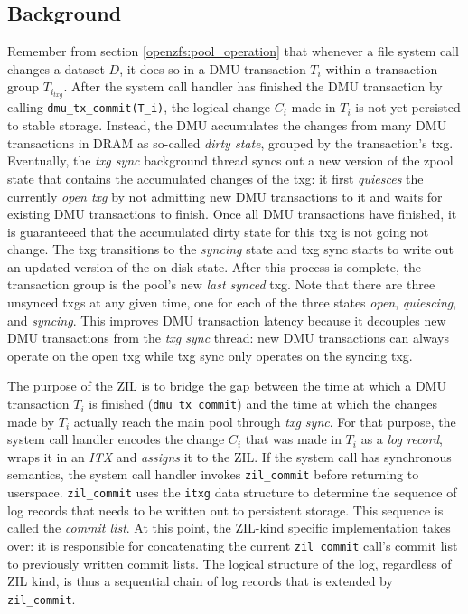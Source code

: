 \documentclass[12pt,a4paper,twoside]{book}
\begin{document}
\subsection{Background}\label{di:prb:background}
Remember from section \ref{openzfs:pool_operation} that whenever a file system call changes a dataset $D$, it does so in a DMU transaction $T_i$ within a transaction group $T_{i_{txg}}$.
After the system call handler has finished the DMU transaction by calling \lstinline{dmu_tx_commit(T_i)}, the logical change $C_i$ made in $T_i$ is not yet persisted to stable storage.
Instead, the DMU accumulates the changes from many DMU transactions in DRAM as so-called \textit{dirty state}, grouped by the transaction's txg.
Eventually, the \textit{txg sync} background thread syncs out a new version of the zpool state that contains the accumulated changes of the txg:
it first \textit{quiesces} the currently \textit{open txg} by not admitting new DMU transactions to it and waits for existing DMU transactions to finish.
Once all DMU transactions have finished, it is guaranteeed that the accumulated dirty state for this txg is not going not change.
The txg transitions to the \textit{syncing} state and txg sync starts to write out an updated version of the on-disk state.
After this process is complete, the transaction group is the pool's new \textit{last synced} txg.
Note that there are three unsynced txgs at any given time, one for each of the three states \textit{open}, \textit{quiescing}, and \textit{syncing}.
This improves DMU transaction latency because it decouples new DMU transactions from the \textit{txg sync} thread:
new DMU transactions can always operate on the open txg while txg sync only operates on the syncing txg.

The purpose of the ZIL is to bridge the gap between the time at which a DMU transaction $T_i$ is finished (\lstinline{dmu_tx_commit}) and the time at which the changes made by $T_i$ actually reach the main pool through \textit{txg sync}.
For that purpose, the system call handler encodes the change $C_i$ that was made in $T_i$ as a \textit{log record}, wraps it in an \textit{ITX} and \textit{assigns} it to the ZIL.
If the system call has synchronous semantics, the system call handler invokes \lstinline{zil_commit} before returning to userspace.
\lstinline{zil_commit} uses the \lstinline{itxg} data structure to determine the sequence of log records that needs to be written out to persistent storage.
This sequence is called the \textit{commit list}.
At this point, the ZIL-kind specific implementation takes over: it is responsible for concatenating the current \lstinline{zil_commit} call's commit list to previously written commit lists.
The logical structure of the log, regardless of ZIL kind, is thus a sequential chain of log records that is extended by \lstinline{zil_commit}.
\end{document}
